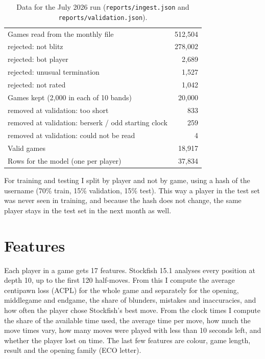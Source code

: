 \documentclass[11pt,a4paper]{article}
\begin{document}
\begin{table}[H]
\centering
\caption{Data for the July 2026 run (\texttt{reports/ingest.json} and \texttt{reports/validation.json}).}
\label{tab:data}
\begin{tabular}{lr}
\toprule
Games read from the monthly file & 512,504 \\
\quad rejected: not blitz & 278,002 \\
\quad rejected: bot player & 2,689 \\
\quad rejected: unusual termination & 1,527 \\
\quad rejected: not rated & 1,042 \\
Games kept (2,000 in each of 10 bands) & 20,000 \\
\quad removed at validation: too short & 833 \\
\quad removed at validation: berserk / odd starting clock & 259 \\
\quad removed at validation: could not be read & 4 \\
Valid games & 18,917 \\
Rows for the model (one per player) & 37,834 \\
\bottomrule
\end{tabular}
\end{table}

For training and testing I split by player and not by game, using a hash of the username
(70\% train, 15\% validation, 15\% test). This way a player in the test set was never seen in
training, and because the hash does not change, the same player stays in the test set in the
next month as well.

\section{Features}

Each player in a game gets 17 features. Stockfish 15.1 analyses every position at depth 10, up to
the first 120 half-moves. From this I compute the average centipawn loss (ACPL) for the whole game
and separately for the opening, middlegame and endgame, the share of blunders, mistakes and
inaccuracies, and how often the player chose Stockfish's best move. From the clock times I compute
the share of the available time used, the average time per move, how much the move times vary,
how many moves were played with less than 10 seconds left, and whether the player lost on time.
The last few features are colour, game length, result and the opening family (ECO letter).
\end{document}

